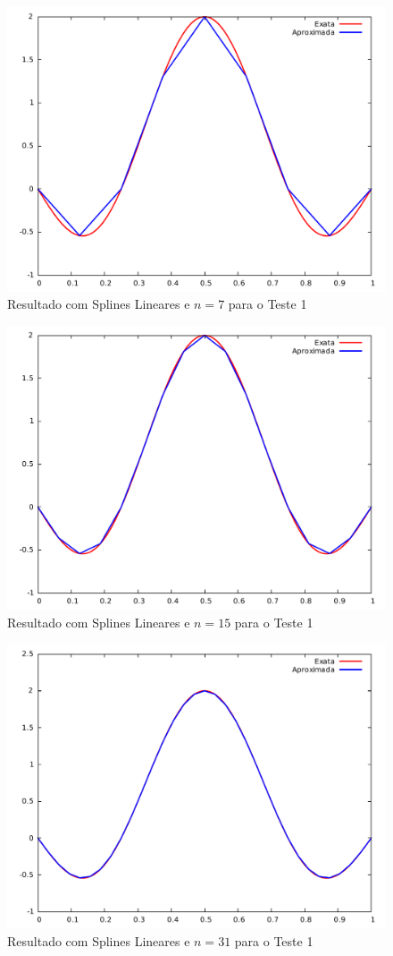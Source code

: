 \documentclass[12pt,a4paper]{report}
\begin{document}
\begin{figure}[htb]
\centering
\includegraphics[width=0.8\linewidth]{splin7.pdf}
\caption{\label{splin}Resultado com Splines Lineares e $n=7$ para o Teste 1}
\end{figure}
\newpage
\begin{figure}[htb]
\centering
\includegraphics[width=0.8\linewidth]{splin15.pdf}
\caption{\label{splin}Resultado com Splines Lineares e $n=15$ para o Teste 1}
\end{figure}
\begin{figure}[h!]
\centering
\includegraphics[width=0.8\linewidth]{splin31.pdf}
\caption{\label{splin}Resultado com Splines Lineares e $n=31$ para o Teste 1}
\end{figure}
\end{document}
